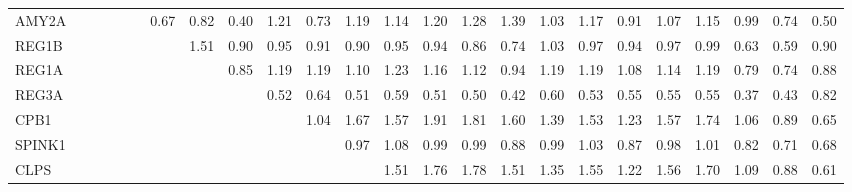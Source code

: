 \begin{longtable}{lrrrrrrrrrrrrrrrrrrrrrrr}
AMY2A    &              &              &              &              &             &        0.67 &        0.82 &        0.40 &       1.21 &         0.73 &       1.19 &       1.14 &       1.20 &        1.28 &        1.39 &           1.03 &          1.17 &      0.91 &        1.07 &        1.15 &       0.99 &        0.74 &        0.50 \\
REG1B    &              &              &              &              &             &             &        1.51 &        0.90 &       0.95 &         0.91 &       0.90 &       0.95 &       0.94 &        0.86 &        0.74 &           1.03 &          0.97 &      0.94 &        0.97 &        0.99 &       0.63 &        0.59 &        0.90 \\
REG1A    &              &              &              &              &             &             &             &        0.85 &       1.19 &         1.19 &       1.10 &       1.23 &       1.16 &        1.12 &        0.94 &           1.19 &          1.19 &      1.08 &        1.14 &        1.19 &       0.79 &        0.74 &        0.88 \\
REG3A    &              &              &              &              &             &             &             &             &       0.52 &         0.64 &       0.51 &       0.59 &       0.51 &        0.50 &        0.42 &           0.60 &          0.53 &      0.55 &        0.55 &        0.55 &       0.37 &        0.43 &        0.82 \\
CPB1     &              &              &              &              &             &             &             &             &            &         1.04 &       1.67 &       1.57 &       1.91 &        1.81 &        1.60 &           1.39 &          1.53 &      1.23 &        1.57 &        1.74 &       1.06 &        0.89 &        0.65 \\
SPINK1   &              &              &              &              &             &             &             &             &            &              &       0.97 &       1.08 &       0.99 &        0.99 &        0.88 &           0.99 &          1.03 &      0.87 &        0.98 &        1.01 &       0.82 &        0.71 &        0.68 \\
CLPS     &              &              &              &              &             &             &             &             &            &              &            &       1.51 &       1.76 &        1.78 &        1.51 &           1.35 &          1.55 &      1.22 &        1.56 &        1.70 &       1.09 &        0.88 &        0.61 \\

\end{longtable}
